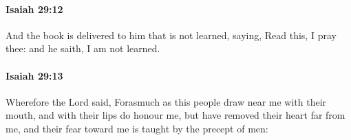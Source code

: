 		\paragraph{Isaiah 29:12} %
			\label{ISAIAH-29-12}

			And the book is delivered to him that is not learned, saying, Read this, I pray thee: and he saith, I am not learned.


		\paragraph{Isaiah 29:13} %
			\label{ISAIAH-29-13}

			Wherefore the Lord said, Forasmuch as this people draw near me with their mouth, and with their lips do honour me, but have removed their heart far from me, and their fear toward me is taught by the precept of men:


